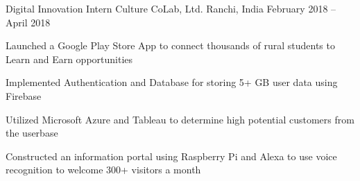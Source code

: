 \begin{cventries}
	\cventry
	{Digital Innovation Intern}
	{Culture CoLab, Ltd.}
	{Ranchi, India}
	{February 2018 – April 2018}
	{\begin{cvitems}
		\item {Launched a Google Play Store App to connect thousands of rural students to Learn and Earn opportunities}
		\item {Implemented Authentication and Database for storing 5+ GB user data using Firebase}
		\item {Utilized Microsoft Azure and Tableau to determine high potential customers from the userbase}
		\item {Constructed an information portal using Raspberry Pi and Alexa to use voice recognition to welcome 300+ visitors a month}
		\end{cvitems}}

\end{cventries}
